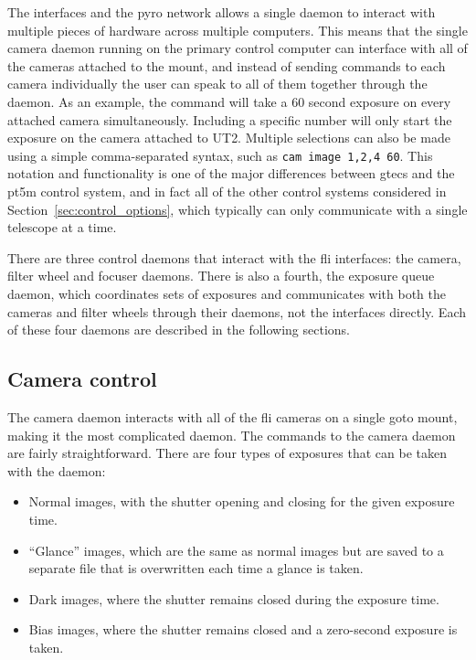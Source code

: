 \begin{colsection}
\begin{colsection}
The interfaces and the \gls{pyro} network allows a single daemon to interact with multiple pieces of hardware across multiple computers. This means that the single camera daemon running on the primary control computer can interface with all of the cameras attached to the mount, and instead of sending commands to each camera individually the user can speak to all of them together through the daemon. As an example, the command  will take a 60 second exposure on every attached camera simultaneously. Including a specific number  will only start the exposure on the camera attached to UT2. Multiple selections can also be made using a simple comma-separated syntax, such as \texttt{cam~image~1,2,4~60}. This notation and functionality is one of the major differences between \gls{gtecs} and the \gls{pt5m} control system, and in fact all of the other control systems considered in Section~\ref{sec:control_options}, which typically can only communicate with a single telescope at a time.

There are three control daemons that interact with the \gls{fli} interfaces: the camera, filter wheel and focuser daemons. There is also a fourth, the exposure queue daemon, which coordinates sets of exposures and communicates with both the cameras and filter wheels through their daemons, not the interfaces directly. Each of these four daemons are described in the following sections.

\end{colsection}


\subsection{Camera control}
\label{sec:cam}
\begin{colsection}

The camera daemon interacts with all of the \gls{fli} cameras on a single \gls{goto} mount, making it the most complicated daemon. The commands to the camera daemon are fairly straightforward. There are four types of exposures that can be taken with the daemon:

\begin{itemize}
    \item Normal images, with the shutter opening and closing for the given exposure time.
    \item ``Glance'' images, which are the same as normal images but are saved to a separate file that is overwritten each time a glance is taken.
    \item Dark images, where the shutter remains closed during the exposure time.
    \item Bias images, where the shutter remains closed and a zero-second exposure is taken.
\end{itemize}


\end{colsection}
\end{colsection}
